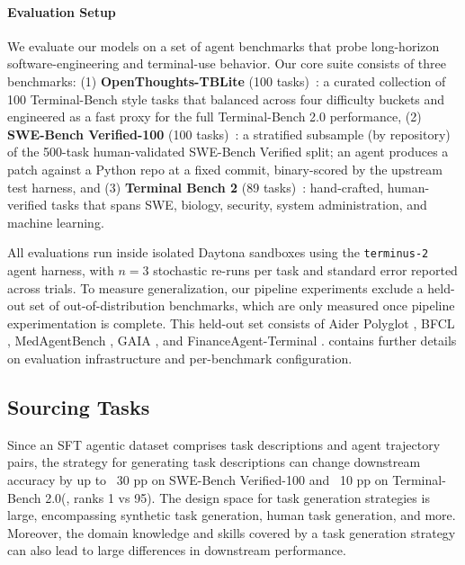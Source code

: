 \documentclass{article}
\begin{document}
\paragraph{Evaluation Setup} 
We evaluate our models on a set of agent benchmarks that probe long-horizon software-engineering and terminal-use behavior. Our core suite consists of three benchmarks: (1) \textbf{OpenThoughts-TBLite} (100 tasks)~\citep{OpenThoughts-TBLite}: a curated collection of 100 Terminal-Bench style tasks that balanced across four difficulty buckets and engineered as a fast proxy for the full Terminal-Bench 2.0 performance, (2) \textbf{SWE-Bench Verified-100} (100 tasks)~\citep{jimenez2024swebenchlanguagemodelsresolve}: a stratified subsample (by repository) of the 500-task human-validated SWE-Bench Verified split; an agent produces a patch against a Python repo at a fixed commit, binary-scored by the upstream test harness, and (3) \textbf{Terminal Bench 2} (89 tasks)~\citep{merrill2026terminalbenchbenchmarkingagentshard}: hand-crafted, human-verified tasks that spans SWE, biology, security, system administration, and machine learning.

All evaluations run inside isolated Daytona sandboxes \citep{Daytona_Infrastructure_2025} using the \texttt{terminus-2} \citep{merrill2026terminalbenchbenchmarkingagentshard} agent harness, with $n=3$ stochastic re-runs per task and standard error reported across trials. To measure generalization, our pipeline experiments exclude a held-out set of out-of-distribution benchmarks, which are only measured once pipeline experimentation is complete. This held-out set consists of Aider Polyglot \citep{aiderpolyglot2024}, BFCL \citep{patil2025bfcl}, MedAgentBench \citep{jiang2025medagentbench}, GAIA \citep{mialon2023gaia}, and FinanceAgent-Terminal \citep{valsai2024financeagent}.  contains further details on evaluation infrastructure and per-benchmark configuration.

\subsection{Sourcing Tasks}
\label{sec:task_generation_ablation}

Since an SFT agentic dataset comprises task descriptions and agent trajectory pairs, the strategy for generating task descriptions can change downstream accuracy by up to ~30 pp on SWE-Bench Verified-100 and ~10 pp on Terminal-Bench 2.0(, ranks 1 vs 95). The design space for task generation strategies is large, encompassing synthetic task generation, human task generation, and more. Moreover, the domain knowledge and skills covered by a task generation strategy can also lead to large differences in downstream performance.
\end{document}
